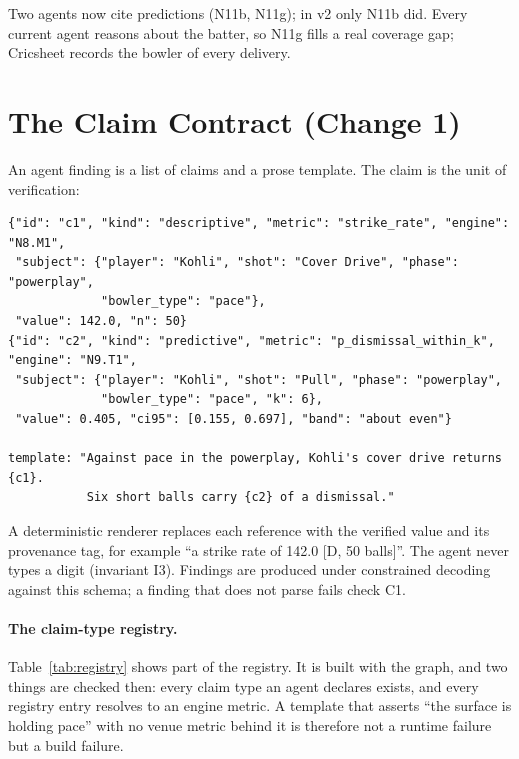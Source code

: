 \documentclass[11pt,a4paper]{article}
\begin{document}
\noindent Two agents now cite predictions (N11b, N11g); in v2 only N11b did.
Every current agent reasons about the batter, so N11g fills a real coverage gap;
Cricsheet records the bowler of every delivery.

\section{The Claim Contract (Change 1)}

An agent finding is a list of claims and a prose template. The claim is the unit
of verification:

\noindent\begin{minipage}{\textwidth}
{\footnotesize
\begin{verbatim}
{"id": "c1", "kind": "descriptive", "metric": "strike_rate", "engine": "N8.M1",
 "subject": {"player": "Kohli", "shot": "Cover Drive", "phase": "powerplay",
             "bowler_type": "pace"},
 "value": 142.0, "n": 50}
{"id": "c2", "kind": "predictive", "metric": "p_dismissal_within_k", "engine": "N9.T1",
 "subject": {"player": "Kohli", "shot": "Pull", "phase": "powerplay",
             "bowler_type": "pace", "k": 6},
 "value": 0.405, "ci95": [0.155, 0.697], "band": "about even"}

template: "Against pace in the powerplay, Kohli's cover drive returns {c1}.
           Six short balls carry {c2} of a dismissal."
\end{verbatim}}
\end{minipage}

\noindent A deterministic renderer replaces each reference with the verified
value and its provenance tag, for example ``a strike rate of 142.0 [D, 50
balls]''. The agent never types a digit (invariant I3). Findings are produced
under constrained decoding against this schema; a finding that does not parse
fails check C1.

\paragraph{The claim-type registry.} Table~\ref{tab:registry} shows part of the
registry. It is built with the graph, and two things are checked then: every
claim type an agent declares exists, and every registry entry resolves to an
engine metric. A template that asserts ``the surface is holding pace'' with no
venue metric behind it is therefore not a runtime failure but a build failure.
\end{document}
